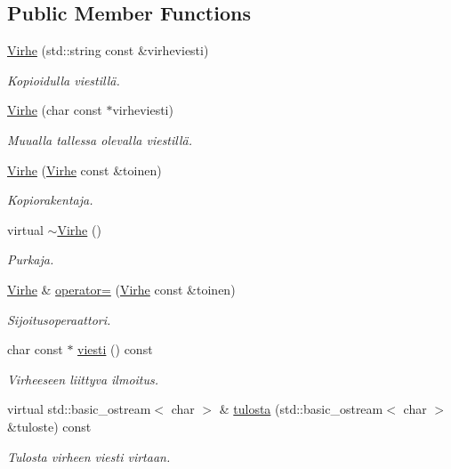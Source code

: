 \subsection*{Public Member Functions}
\begin{DoxyCompactItemize}
\item 
\hyperlink{class_julkinen_1_1_virhe_a5a745aa6f700e7ea3a9b7f09e9ca5455}{Virhe} (std\+::string const \&virheviesti)
\begin{DoxyCompactList}\small\item\em Kopioidulla viestillä. \end{DoxyCompactList}\item 
\hyperlink{class_julkinen_1_1_virhe_a019192eb91000290fd9a36999532fb4b}{Virhe} (char const $\ast$virheviesti)
\begin{DoxyCompactList}\small\item\em Muualla tallessa olevalla viestillä. \end{DoxyCompactList}\item 
\hyperlink{class_julkinen_1_1_virhe_aba36e3156c54aa1281dc5be29b76af0a}{Virhe} (\hyperlink{class_julkinen_1_1_virhe}{Virhe} const \&toinen)
\begin{DoxyCompactList}\small\item\em Kopiorakentaja. \end{DoxyCompactList}\item 
virtual \hyperlink{class_julkinen_1_1_virhe_ab71f7f303930ccd1b48bda352412d625}{$\sim$\+Virhe} ()
\begin{DoxyCompactList}\small\item\em Purkaja. \end{DoxyCompactList}\item 
\hyperlink{class_julkinen_1_1_virhe}{Virhe} \& \hyperlink{class_julkinen_1_1_virhe_ad5ee9d8d642c20d464c6188088722492}{operator=} (\hyperlink{class_julkinen_1_1_virhe}{Virhe} const \&toinen)
\begin{DoxyCompactList}\small\item\em Sijoitusoperaattori. \end{DoxyCompactList}\item 
char const $\ast$ \hyperlink{class_julkinen_1_1_virhe_a14738e633b74fce18efbaf1086403013}{viesti} () const 
\begin{DoxyCompactList}\small\item\em Virheeseen liittyva ilmoitus. \end{DoxyCompactList}\item 
virtual std\+::basic\+\_\+ostream$<$ char $>$ \& \hyperlink{class_julkinen_1_1_virhe_a36a2644943038f9760b5d76a1960b00d}{tulosta} (std\+::basic\+\_\+ostream$<$ char $>$ \&tuloste) const 
\begin{DoxyCompactList}\small\item\em Tulosta virheen viesti virtaan. \end{DoxyCompactList}\end{DoxyCompactItemize}
